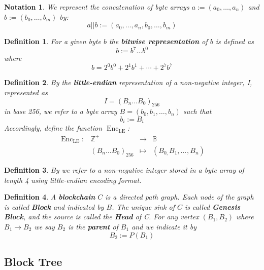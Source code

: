 \documentclass{article}
\newcommand{\assign}{:=}
\newcommand{\tmname}[1]{\textsc{#1}}
\newcommand{\tmop}[1]{\ensuremath{\operatorname{#1}}}
\newcommand{\tmstrong}[1]{\textbf{#1}}
\newcommand{\tmtextbf}[1]{{\bfseries{#1}}}
\newcommand{\tmtextsc}[1]{{\scshape{#1}}}
\newcommand{\tmtexttt}[1]{{\ttfamily{#1}}}
\newcommand{\tmverbatim}[1]{{\ttfamily{#1}}}
\newtheorem{definition}{Definition}
\newtheorem{notation}{Notation}
\providecommand{\tmname}[1]{\tmtextsc{#1}}
\providecommand{\tmop}[1]{\ensuremath{\mathrm{#1}}}
\providecommand{\tmstrong}[1]{\tmtextbf{#1}}
\providecommand{\tmtextbf}[1]{\tmtextbf{#1}}
\providecommand{\tmverbatim}[1]{\tmtexttt{#1}}
\newtheorem{definition}{Definition}
\newtheorem{notation}{Notation}
\begin{document}
\begin{notation}
  We represent the concatenation of byte arrays $a \assign (a_0, \ldots, a_n)$
  and $b \assign (b_0, \ldots, b_m)$ by:
  \[ a || b \assign (a_0, \ldots, a_n, b_0, \ldots, b_m) \]
\end{notation}

\begin{definition}
  \label{defn-bit-rep}For a given byte $b$ the {\tmstrong{bitwise
  representation}} of $b$ is defined as
  \[ b \assign b^7 \ldots b^0 \]
  where
  \[ b = 2^0 b^0 + 2^1 b^1 + \cdots + 2^7 b^7 \]
\end{definition}

\begin{definition}
  \label{defn-little-endian}By \tmverbatim{}the {\tmstrong{little-endian}}
  representation of a non-negative integer, I, represented as
  \[ I = (B_n \ldots B_0)_{256} \]
  in base 256, we refer to a byte array $B = (b_0, b_1, \ldots, b_n)$ such
  that
  \[ b_i \assign B_i \]
  Accordingly, define the function $\tmop{Enc}_{\tmop{LE}}$:
  \[ \begin{array}{llll}
       \tmop{Enc}_{\tmop{LE}} : & \mathbb{Z}^+ & \rightarrow & \mathbb{B}\\
       & (B_n \ldots B_0)_{256} & \mapsto & (B_{0,} B_1, \ldots_{}, B_n)
     \end{array} \]
  
\end{definition}

\begin{definition}
  By {\tmname{{\tmstrong{\tmverbatim{UINT32}}}}} we refer to a non-negative
  integer stored in a byte array of length 4 using little-endian encoding
  format.
\end{definition}

\begin{definition}
  A {\tmstrong{blockchain}} $C$ is a directed path graph. Each node of the
  graph is called {\tmstrong{Block}} and indicated by {\tmstrong{$B$}}. The
  unique sink of $C$ is called {\tmstrong{Genesis Block}}, and the source is
  called the {\tmstrong{Head}} of C. For any vertex $(B_1, B_2)$ where $B_1
  \rightarrow B_2$ we say $B_2$ is the {\tmstrong{parent}} of $B_1$ and we
  indicate it by
  \[ B_2 \assign P (B_1) \]
\end{definition}

\subsection{Block Tree}
\end{document}
